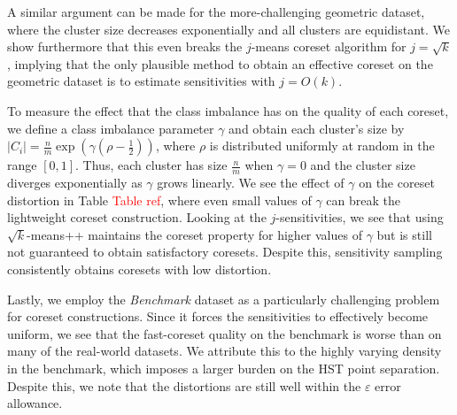 A similar argument can be made for the more-challenging geometric dataset, where the cluster size decreases exponentially and all clusters are equidistant.
We show furthermore that this even breaks the $j$-means coreset algorithm for $j = \sqrt{k}$, implying that the only plausible method to obtain an effective
coreset on the geometric dataset is to estimate sensitivities with $j = O(k)$.

To measure the effect that the class imbalance has on the quality of each coreset, we define a class imbalance parameter $\gamma$ and obtain each
cluster's size by $|C_i| = \frac{n}{m} \exp \left( \gamma(\rho - \frac{1}{2}) \right)$, where $\rho$ is distributed uniformly at random in the range $[0, 1]$.
Thus, each cluster has size $\frac{n}{m}$ when $\gamma = 0$ and the cluster size diverges exponentially as $\gamma$ grows linearly. We see the effect of $\gamma$ on the coreset
distortion in Table \textcolor{red}{Table ref}, where even small values of $\gamma$ can break the lightweight coreset construction. Looking at the
$j$-sensitivities, we see that using $\sqrt{k}$-means++ maintains the coreset property for higher values of $\gamma$ but is still not guaranteed
to obtain satisfactory coresets. Despite this, sensitivity sampling consistently obtains coresets with low distortion.

Lastly, we employ the \emph{Benchmark} dataset as a particularly challenging problem for coreset constructions. Since it forces the sensitivities to effectively
become uniform, we see that the fast-coreset quality on the benchmark is worse than on many of the real-world datasets. We attribute this to the highly varying
density in the benchmark, which imposes a larger burden on the HST point separation. Despite this, we note that the distortions are still well within the
$\varepsilon$ error allowance.
